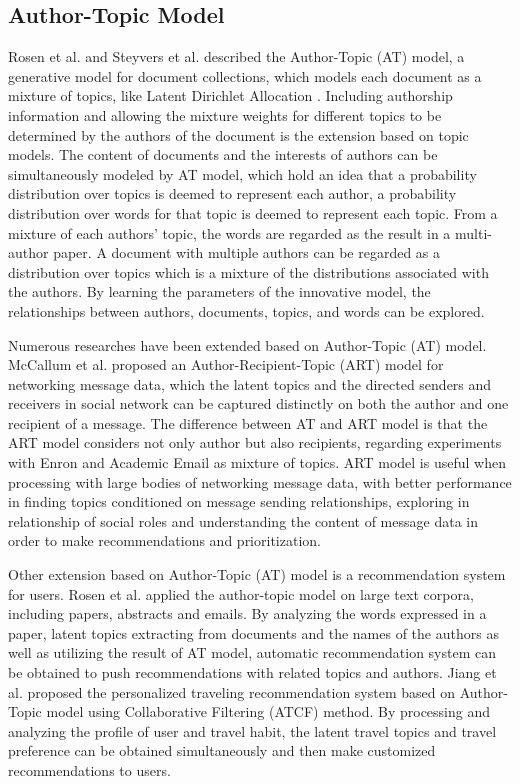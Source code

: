 \subsection{Author-Topic Model}\label{2at}

Rosen et al. \cite{rosen2004author} and Steyvers et al. \cite{steyvers2004probabilistic} described the Author-Topic (AT) model, a generative model for document collections, which models each document as a mixture of topics, like Latent Dirichlet Allocation \cite{blei2003latent}. Including authorship information and allowing the mixture weights for different topics to be determined by the authors of the document is the extension based on topic models. The content of documents and the interests of authors can be simultaneously modeled by AT model, which hold an idea that a probability distribution over topics is deemed to represent each author,  a probability distribution over words for that topic is deemed to represent each topic. From a mixture of each authors’ topic, the words are regarded as the result in a multi-author paper. A document with multiple authors can be regarded as a distribution over topics which is a mixture of the distributions associated with the authors. By learning the parameters of the innovative model, the relationships between authors, documents, topics, and words can be explored.

Numerous researches have been extended based on Author-Topic (AT) model. McCallum et al. \cite{mccallum2005author} proposed an Author-Recipient-Topic (ART) model for networking message data, which the latent topics and the directed senders and receivers in social network can be captured  distinctly on both the author and one recipient of a message. The difference between AT and ART model is that the ART model considers not only author but also recipients, regarding experiments with Enron and Academic Email as mixture of topics. ART model is useful when processing with large bodies of networking message data, with better performance in finding topics conditioned on message sending relationships,  exploring in relationship of social roles and understanding the content of message data in order to make recommendations and prioritization.

Other extension based on Author-Topic (AT) model is a recommendation system for users. Rosen et al. \cite{rosen2010learning} applied the author-topic model on large text corpora, including papers, abstracts and emails. By analyzing the words expressed in a paper, latent topics extracting from documents and the names of the authors as well as utilizing the result of AT model, automatic recommendation system can be obtained to push recommendations with related topics and authors. Jiang et al. \cite{jiang2015author} proposed the personalized traveling recommendation system based on Author-Topic model using Collaborative Filtering (ATCF) method. By processing and analyzing the profile of user and travel habit, the latent travel topics and travel preference can be obtained simultaneously and then make customized recommendations to users.

